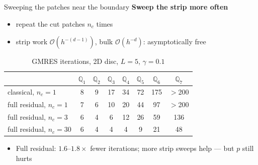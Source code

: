 \documentclass{beamer}
\begin{document}
\begin{frame}{Sweeping the patches near the boundary}
    \small
    \textbf{Sweep the strip more often}
    \begin{itemize}
        \item repeat the cut patches $n_c$ times
        \item strip work $\mathcal O(h^{-(d-1)})$, bulk $\mathcal O(h^{-d})$: \alert{asymptotically free}
    \end{itemize}
    \pause
    \begin{table}
        \centering
        \caption{GMRES iterations, 2D disc, $L=5$, $\gamma=0.1$}
        \footnotesize
        \begin{tabular}{lccccccc}
            \toprule
                                    & $\mathbb Q_1$ & $\mathbb Q_2$ & $\mathbb Q_3$ & $\mathbb Q_4$ & $\mathbb Q_5$ & $\mathbb Q_6$ & $\mathbb Q_7$ \\
            \midrule
            classical, $n_c=1$      & 8             & 9             & 17            & 34            & 72            & 175           & $>$200        \\
            full residual, $n_c=1$  & 7             & 6             & 10            & 20            & 44            & 97            & $>$200        \\
            \midrule
            full residual, $n_c=3$  & 6             & 4             & 6             & 12            & 26            & 59            & 136           \\
            full residual, $n_c=30$ & 6             & 4             & 4             & 4             & 9             & 21            & 48            \\
            \bottomrule
        \end{tabular}
    \end{table}
    \begin{itemize}
        \small
        \item Full residual: $1.6$--$1.8\times$ fewer iterations; more strip sweeps help --- but $p$ still hurts
    \end{itemize}
\end{frame}
\end{document}

